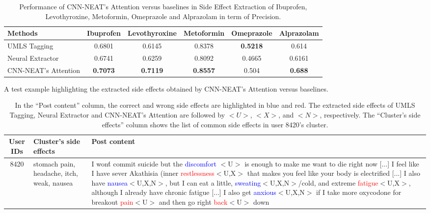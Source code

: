 \documentclass{bmcart}
\begin{document}
\begin{backmatter}
\begin{table}[h!]
  \label{table:se_discovery2}
\end{table}
\begin{table}[h!]
  \caption{Performance of CNN-NEAT's Attention versus baselines in Side Effect Extraction of Ibuprofen, Levothyroxine, Metoformin, Omeprazole and Alprazolam in term of Precision.}
  \scalebox{1.2}
  \footnotesize
  \begin{tabular}{l|c c c c c}
    \hline
    \textbf{Methods} & Ibuprofen & Levothyroxine & Metoformin & Omeprazole & Alprazolam \\ \hline
    UMLS Tagging & 0.6801 & 0.6145 & 0.8378 & \textbf{0.5218} & 0.614 \\
    Neural Extractor~\cite{ding2018attentive} & 0.6741 & 0.6259 & 0.8092 & 0.4665 & 0.6161 \\
    CNN-NEAT's Attention & \textbf{0.7073} & \textbf{0.7119} & \textbf{0.8557} & 0.504 & \textbf{0.688} \\ \hline
  \end{tabular}
  \label{table:se_extraction}
\end{table}
\begin{table}[h!]
  \caption{A test example highlighting the extracted side effects obtained by CNN-NEAT's Attention versus baselines.}
  \scalebox{1.2}
  \footnotesize
  \begin{tabular}{c p{3cm} p{7cm}}
    \hline
    User IDs & Cluster's side effects & Post content \\ \hline
    8420 & stomach pain, headache, itch, weak, nausea & I won\'t commit suicide but the \textcolor{blue}{discomfort} $<$U$>$ is enough to make me want to die right now [...] I feel like I have sever Akathisia (inner \textcolor{red}{restlessness}$<$U,X$>$ that makes you feel like your body is electrified [...] I also have \textcolor{blue}{nausea}$<$U,X,N$>$, but I can eat a little, \textcolor{blue}{sweating}$<$U,X,N$>$/cold, and extreme \textcolor{red}{fatigue}$<$U,X$>$, although I already have chronic fatigue [...] I also get \textcolor{blue}{anxious}$<$U,X,N$>$ if I take more oxycodone for breakout \textcolor{red}{pain}$<$U$>$ and then go right \textcolor{red}{back}$<$U$>$ down \\ \hline
  \end{tabular}
  \caption*{In the ``Post content'' column, the correct and wrong side effects are highlighted in blue and red. The extracted side effects of UMLS Tagging, Neural Extractor and CNN-NEAT's Attention are followed by $<U>$, $<X>$, and $<N>$, respectively. The ``Cluster's side effects'' column shows the list of common side effects in user 8420's cluster.}

\end{table}
\end{backmatter}
\end{document}

